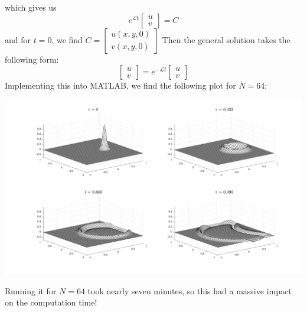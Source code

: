 \documentclass{article}
\begin{document}
which gives us
\[e^{\mathcal{L}t}\begin{bmatrix}
    u\\
    v
\end{bmatrix} = C\]
and for $t=0$, we find $C = \begin{bmatrix}
    u(x,y,0)\\
    v(x,y,0)
\end{bmatrix}$
Then the general solution takes the following form:
\[\begin{bmatrix}
    u\\
    v
\end{bmatrix} = e^{-\mathcal{L}t}\begin{bmatrix}
    u\\
    v
\end{bmatrix}\]
Implementing this into MATLAB, we find the following plot for $N = 64$:
\begin{center}
    \includegraphics[scale = 0.25]{2DwaveEqwMatrixExponential}
\end{center}
Running it for $N = 64$ took nearly seven minutes, so this had a massive impact on the computation time!
\end{document}
